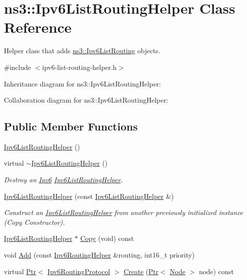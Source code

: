 \hypertarget{classns3_1_1Ipv6ListRoutingHelper}{}\section{ns3\+:\+:Ipv6\+List\+Routing\+Helper Class Reference}
\label{classns3_1_1Ipv6ListRoutingHelper}


Helper class that adds \hyperlink{classns3_1_1Ipv6ListRouting}{ns3\+::\+Ipv6\+List\+Routing} objects.  




{\ttfamily \#include $<$ipv6-\/list-\/routing-\/helper.\+h$>$}



Inheritance diagram for ns3\+:\+:Ipv6\+List\+Routing\+Helper\+:


Collaboration diagram for ns3\+:\+:Ipv6\+List\+Routing\+Helper\+:
\subsection*{Public Member Functions}
\begin{DoxyCompactItemize}
\item 
\hyperlink{classns3_1_1Ipv6ListRoutingHelper_a6b652851359cbadfa0ef46375a023ff4}{Ipv6\+List\+Routing\+Helper} ()
\item 
virtual \hyperlink{classns3_1_1Ipv6ListRoutingHelper_a5a4ecb7d8c9f7fbd47a808f02645e061}{$\sim$\+Ipv6\+List\+Routing\+Helper} ()
\begin{DoxyCompactList}\small\item\em Destroy an \hyperlink{classns3_1_1Ipv6}{Ipv6} \hyperlink{classns3_1_1Ipv6ListRoutingHelper}{Ipv6\+List\+Routing\+Helper}. \end{DoxyCompactList}\item 
\hyperlink{classns3_1_1Ipv6ListRoutingHelper_a5b60d6fd5abac923bfbab7739558e880}{Ipv6\+List\+Routing\+Helper} (const \hyperlink{classns3_1_1Ipv6ListRoutingHelper}{Ipv6\+List\+Routing\+Helper} \&)
\begin{DoxyCompactList}\small\item\em Construct an \hyperlink{classns3_1_1Ipv6ListRoutingHelper}{Ipv6\+List\+Routing\+Helper} from another previously initialized instance (Copy Constructor). \end{DoxyCompactList}\item 
\hyperlink{classns3_1_1Ipv6ListRoutingHelper}{Ipv6\+List\+Routing\+Helper} $\ast$ \hyperlink{classns3_1_1Ipv6ListRoutingHelper_a6866f4f303796ccad404cc90f491156e}{Copy} (void) const 
\item 
void \hyperlink{classns3_1_1Ipv6ListRoutingHelper_a6b186b17c8a21b009525dbb32a5b9d84}{Add} (const \hyperlink{classns3_1_1Ipv6RoutingHelper}{Ipv6\+Routing\+Helper} \&routing, int16\+\_\+t priority)
\item 
virtual \hyperlink{classns3_1_1Ptr}{Ptr}$<$ \hyperlink{classns3_1_1Ipv6RoutingProtocol}{Ipv6\+Routing\+Protocol} $>$ \hyperlink{classns3_1_1Ipv6ListRoutingHelper_ac027288962db9db7bff901e02b7d558e}{Create} (\hyperlink{classns3_1_1Ptr}{Ptr}$<$ \hyperlink{classns3_1_1Node}{Node} $>$ node) const 
\end{DoxyCompactItemize}
